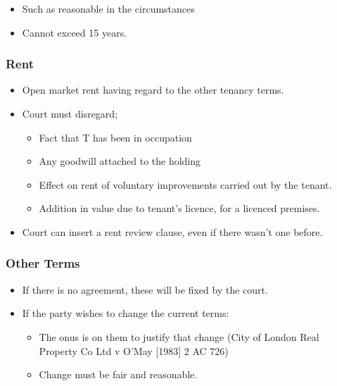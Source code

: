 \documentclass[
]{article}
\providecommand{\tightlist}{%
  \setlength{\itemsep}{0pt}\setlength{\parskip}{0pt}}
\begin{document}
\begin{itemize}
\tightlist
\item
  Such as reasonable in the circumstances
\item
  Cannot exceed 15 years.
\end{itemize}

\hypertarget{rent}{%
\subsubsection{Rent}\label{rent}}

\begin{itemize}
\tightlist
\item
  Open market rent having regard to the other tenancy terms.
\item
  Court must disregard;

  \begin{itemize}
  \tightlist
  \item
    Fact that T has been in occupation
  \item
    Any goodwill attached to the holding
  \item
    Effect on rent of voluntary improvements carried out by the tenant.
  \item
    Addition in value due to tenant's licence, for a licenced premises.
  \end{itemize}
\item
  Court can insert a rent review clause, even if there wasn't one
  before.
\end{itemize}

\hypertarget{other-terms}{%
\subsubsection{Other Terms}\label{other-terms}}

\begin{itemize}
\tightlist
\item
  If there is no agreement, these will be fixed by the court.
\item
  If the party wishes to change the current terms:

  \begin{itemize}
  \tightlist
  \item
    The onus is on them to justify that change (City of London Real
    Property Co Ltd v O'May {[}1983{]} 2 AC 726)
  \item
    Change must be fair and reasonable.
  \end{itemize}
\end{itemize}
\end{document}

